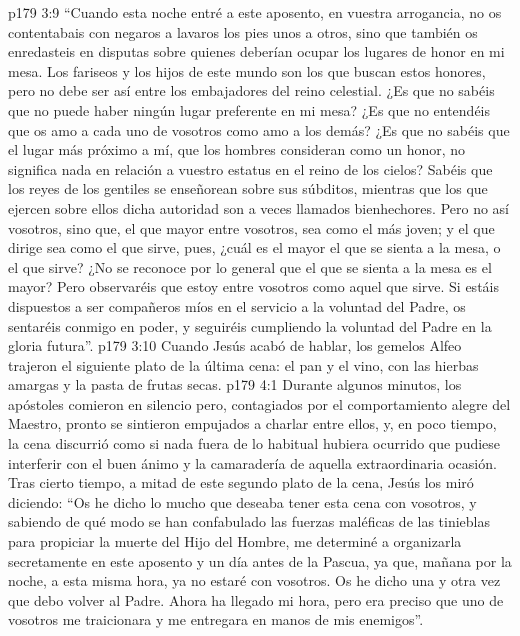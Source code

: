 \vs p179 3:9 “Cuando esta noche entré a este aposento, en vuestra arrogancia, no os contentabais con negaros a lavaros los pies unos a otros, sino que también os enredasteis en disputas sobre quienes deberían ocupar los lugares de honor en mi mesa. Los fariseos y los hijos de este mundo son los que buscan estos honores, pero no debe ser así entre los embajadores del reino celestial. ¿Es que no sabéis que no puede haber ningún lugar preferente en mi mesa? ¿Es que no entendéis que os amo a cada uno de vosotros como amo a los demás? ¿Es que no sabéis que el lugar más próximo a mí, que los hombres consideran como un honor, no significa nada en relación a vuestro estatus en el reino de los cielos? Sabéis que los reyes de los gentiles se enseñorean sobre sus súbditos, mientras que los que ejercen sobre ellos dicha autoridad son a veces llamados bienhechores. Pero no así vosotros, sino que, el que mayor entre vosotros, sea como el más joven; y el que dirige sea como el que sirve, pues, ¿cuál es el mayor el que se sienta a la mesa, o el que sirve? ¿No se reconoce por lo general que el que se sienta a la mesa es el mayor? Pero observaréis que estoy entre vosotros como aquel que sirve. Si estáis dispuestos a ser compañeros míos en el servicio a la voluntad del Padre, os sentaréis conmigo en poder, y seguiréis cumpliendo la voluntad del Padre en la gloria futura”.
\vs p179 3:10 Cuando Jesús acabó de hablar, los gemelos Alfeo trajeron el siguiente plato de la última cena: el pan y el vino, con las hierbas amargas y la pasta de frutas secas.
\vs p179 4:1 Durante algunos minutos, los apóstoles comieron en silencio pero, contagiados por el comportamiento alegre del Maestro, pronto se sintieron empujados a charlar entre ellos, y, en poco tiempo, la cena discurrió como si nada fuera de lo habitual hubiera ocurrido que pudiese interferir con el buen ánimo y la camaradería de aquella extraordinaria ocasión. Tras cierto tiempo, a mitad de este segundo plato de la cena, Jesús los miró diciendo: “Os he dicho lo mucho que deseaba tener esta cena con vosotros, y sabiendo de qué modo se han confabulado las fuerzas maléficas de las tinieblas para propiciar la muerte del Hijo del Hombre, me determiné a organizarla secretamente en este aposento y un día antes de la Pascua, ya que, mañana por la noche, a esta misma hora, ya no estaré con vosotros. Os he dicho una y otra vez que debo volver al Padre. Ahora ha llegado mi hora, pero era preciso que uno de vosotros me traicionara y me entregara en manos de mis enemigos”.
